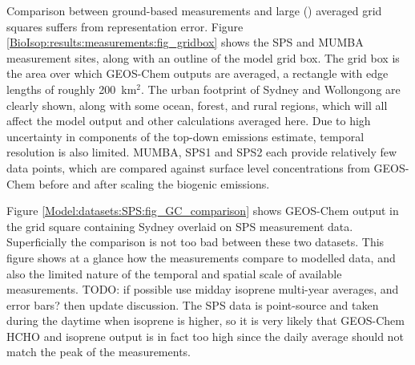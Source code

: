     Comparison between ground-based measurements and large (\lowhr) averaged grid squares suffers from representation error.
    Figure \ref{BioIsop:results:measurements:fig_gridbox} shows the SPS and MUMBA measurement sites, along with an outline of the \lowhr model grid box.
    The grid box is the area over which GEOS-Chem outputs are averaged, a rectangle with edge lengths of roughly 200~km$^{2}$.
    The urban footprint of Sydney and Wollongong are clearly shown, along with some ocean, forest, and rural regions, which will all affect the model output and other calculations averaged here.
    Due to high uncertainty in components of the top-down emissions estimate, temporal resolution is also limited.
    MUMBA, SPS1 and SPS2 each provide relatively few data points, which are compared against surface level concentrations from GEOS-Chem before and after scaling the biogenic emissions.
    
    
    Figure \ref{Model:datasets:SPS:fig_GC_comparison} shows GEOS-Chem output in the grid square containing Sydney overlaid on SPS measurement data.
    Superficially the comparison is not too bad between these two datasets.
    This figure shows at a glance how the measurements compare to modelled data, and also the limited nature of the temporal and spatial scale of available measurements.
    TODO: if possible use midday isoprene multi-year averages, and error bars? then update discussion.
    The SPS data is point-source and taken during the daytime when isoprene is higher, so it is very likely that GEOS-Chem HCHO and isoprene output is in fact too high since the daily average should not match the peak of the measurements.
    
    
    
